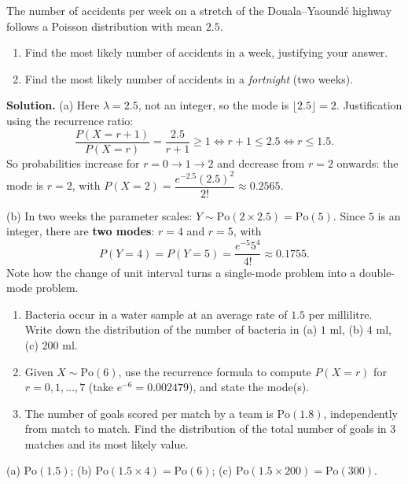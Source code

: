 \documentclass[11pt]{article}
\begin{document}
\begin{exoresolu}
The number of accidents per week on a stretch of the Douala--Yaound\'e highway follows a Poisson distribution with mean $2.5$.
\begin{enumerate}
\item[(a)] Find the most likely number of accidents in a week, justifying your answer.
\item[(b)] Find the most likely number of accidents in a \emph{fortnight} (two weeks).
\end{enumerate}
\tcblower
\textbf{Solution.}
(a) Here $\lambda = 2.5$, not an integer, so the mode is $\lfloor 2.5 \rfloor = 2$. Justification using the recurrence ratio:
\[
\frac{P(X=r+1)}{P(X=r)} = \frac{2.5}{r+1} \geq 1 \iff r+1 \leq 2.5 \iff r \leq 1.5.
\]
So probabilities increase for $r = 0 \to 1 \to 2$ and decrease from $r = 2$ onwards: the mode is $r = 2$, with $P(X=2) = \dfrac{e^{-2.5}(2.5)^2}{2!} \approx 0.2565$.

(b) In two weeks the parameter scales: $Y \sim \mathrm{Po}(2 \times 2.5) = \mathrm{Po}(5)$. Since $5$ is an integer, there are \textbf{two modes}: $r = 4$ and $r = 5$, with
\[
P(Y=4) = P(Y=5) = \frac{e^{-5}5^{4}}{4!} \approx 0.1755.
\]
Note how the change of unit interval turns a single-mode problem into a double-mode problem.
\end{exoresolu}

\begin{exercice}[Practice]
\begin{enumerate}
\item Bacteria occur in a water sample at an average rate of $1.5$ per millilitre. Write down the distribution of the number of bacteria in (a) $1$ ml, (b) $4$ ml, (c) $200$ ml.
\item Given $X \sim \mathrm{Po}(6)$, use the recurrence formula to compute $P(X=r)$ for $r = 0, 1, \ldots, 7$ (take $e^{-6} = 0.002479$), and state the mode(s).
\item The number of goals scored per match by a team is $\mathrm{Po}(1.8)$, independently from match to match. Find the distribution of the total number of goals in $3$ matches and its most likely value.
\end{enumerate}
\end{exercice}

\begin{corrige}[Exercise 1]
(a) $\mathrm{Po}(1.5)$; (b) $\mathrm{Po}(1.5 \times 4) = \mathrm{Po}(6)$; (c) $\mathrm{Po}(1.5 \times 200) = \mathrm{Po}(300)$.
\end{corrige}
\end{document}
